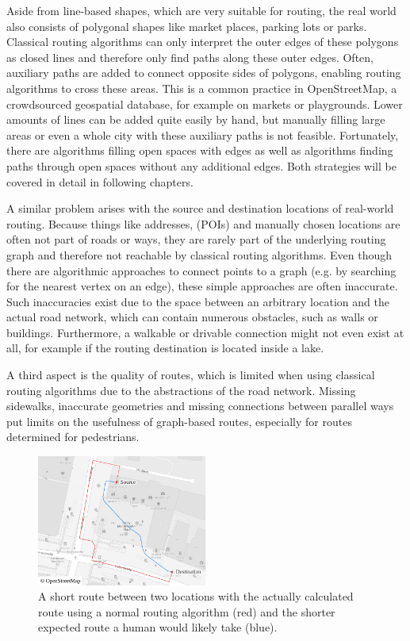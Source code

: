 	Aside from line-based shapes, which are very suitable for routing, the real world also consists of polygonal shapes like market places, parking lots or parks.
	Classical routing algorithms can only interpret the outer edges of these polygons as closed lines and therefore only find paths along these outer edges.
	Often, auxiliary paths are added to connect opposite sides of polygons, enabling routing algorithms to cross these areas.
	This is a common practice in OpenStreetMap, a crowdsourced geospatial database, for example on markets or playgrounds.
	Lower amounts of lines can be added quite easily by hand, but manually filling large areas or even a whole city with these auxiliary paths is not feasible.
	Fortunately, there are algorithms filling open spaces with edges as well as algorithms finding paths through open spaces without any additional edges.
	Both strategies will be covered in detail in following chapters.
	
	A similar problem arises with the source and destination locations of real-world routing.
	Because things like addresses,  (POIs) and manually chosen locations are often not part of roads or ways, they are rarely part of the underlying routing graph and therefore not reachable by classical routing algorithms.
	Even though there are algorithmic approaches to connect points to a graph (e.g. by searching for the nearest vertex on an edge), these simple approaches are often inaccurate.
	Such inaccuracies exist due to the space between an arbitrary location and the actual road network, which can contain numerous obstacles, such as walls or buildings.
	Furthermore, a walkable or drivable connection might not even exist at all, for example if the routing destination is located inside a lake.
	
	A third aspect is the quality of routes, which is limited when using classical routing algorithms due to the abstractions of the road network.
	Missing sidewalks, inaccurate geometries and missing connections between parallel ways put limits on the usefulness of graph-based routes, especially for routes determined for pedestrians.
	
	\begin{figure}[h]
		\begin{figcenter}
			\includegraphics[width=0.5\textwidth]{images/qgis-routing-osterstrasse_expected-routing}
		\end{figcenter}
		\caption{A short route between two locations with the actually calculated route using a normal routing algorithm (red) and the shorter expected route a human would likely take (blue).}
	\end{figure}
	
